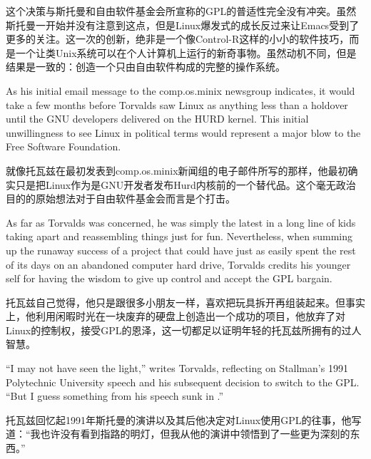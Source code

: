 \ifdefined\chs
这个决策与斯托曼和自由软件基金会所宣称的GPL的普适性完全没有冲突。虽然斯托曼一开始并没有注意到这点，但是Linux爆发式的成长反过来让Emacs受到了更多的关注。这一次的创新，绝非是一个像Control-R这样的小小的软件技巧，而是一个让类Unix系统可以在个人计算机上运行的新奇事物。虽然动机不同，但是结果是一致的：创造一个只由自由软件构成的完整的操作系统。
\fi

\ifdefined\eng
As his initial email message to the comp.os.minix newsgroup indicates, it would take a few months before Torvalds saw Linux as anything less than a holdover until the GNU developers delivered on the HURD kernel. This initial unwillingness to see Linux in political terms would represent a major blow to the Free Software Foundation.
\fi

\ifdefined\chs
就像托瓦兹在最初发表到comp.os.minix新闻组的电子邮件所写的那样，他最初确实只是把Linux作为是GNU开发者发布Hurd内核前的一个替代品。这个毫无政治目的的原始想法对于自由软件基金会而言是个打击。
\fi

\ifdefined\eng
As far as Torvalds was concerned, he was simply the latest in a long line of kids taking apart and reassembling things just for fun. Nevertheless, when summing up the runaway success of a project that could have just as easily spent the rest of its days on an abandoned computer hard drive, Torvalds credits his younger self for having the wisdom to give up control and accept the GPL bargain.
\fi

\ifdefined\chs
托瓦兹自己觉得，他只是跟很多小朋友一样，喜欢把玩具拆开再组装起来。但事实上，他利用闲暇时光在一块废弃的硬盘上创造出一个成功的项目，他放弃了对Linux的控制权，接受GPL的恩泽，这一切都足以证明年轻的托瓦兹所拥有的过人智慧。
\fi

\ifdefined\eng
``I may not have seen the light,'' writes Torvalds, reflecting on Stallman's 1991 Polytechnic University speech and his subsequent decision to switch to the GPL. ``But I guess something from his speech sunk in .''
\fi

\ifdefined\chs
托瓦兹回忆起1991年斯托曼的演讲以及其后他决定对Linux使用GPL的往事，他写道：``我也许没有看到指路的明灯，但我从他的演讲中领悟到了一些更为深刻的东西。''
\fi

